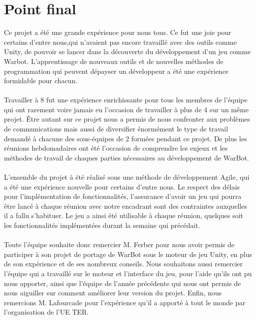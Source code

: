 \documentclass{report}
\begin{document}
\section{Point final}
Ce projet a été une grande expérience pour nous tous.\newline
Ce fut une joie pour certains d’entre nous,qui n’avaient pas encore travaillé avec des outils comme Unity,  de pouvoir se lancer dans la découverte du développement d’un jeu comme Warbot.\newline
L’apprentissage de nouveaux outils et de nouvelles méthodes de programmation qui peuvent dépayser un développeur a été une expérience formidable pour chacun.
\paragraph{}
Travailler à 8 fut une expérience enrichissante pour tous les membres de l’équipe qui ont rarement voire jamais eu l’occasion de travailler à plus de 4 sur un même projet. \newline
Être autant sur ce projet nous a permis de nous confronter aux problèmes de communications mais aussi de diversifier énormément le type de travail demandé à chacune des sous-équipes de 2 formées pendant ce projet. De plus les réunions hebdomadaires ont été l’occasion de comprendre les enjeux et les méthodes de travail de chaques parties nécessaires au développement de WarBot. 
\paragraph{}
L’ensemble du projet à été réalisé sous une méthode de développement Agile, qui a été une expérience nouvelle pour certains d’entre nous.\newline
Le respect des délais pour l’implémentation de fonctionnalités, l’assurance d’avoir un jeu qui pourra être lancé à chaque réunion avec notre encadrant sont des contraintes auxquelles il a fallu s’habituer. \newline
Le jeu a ainsi été utilisable à chaque réunion, quelques soit les fonctionnalités implémentées durant la semaine qui précédait. 
\paragraph{}
Toute l’équipe souhaite donc remercier M. Ferber pour nous avoir permis de participer à son projet de portage de WarBot sous le moteur de jeu Unity, en plus de son expérience et de ses nombreux conseils. \newline
Nous souhaitons aussi remercier l’équipe qui a travaillé sur le moteur et l’interface du jeu, pour l’aide qu’ils ont pu nous apporter, ainsi que l’équipe de l’année précédente qui nous ont permis de nous aiguiller sur comment améliorer leur version du projet. \newline
Enfin, nous remercions M. Lafourcade pour l’expérience qu’il a apporté à tout le monde par l’organisation de l’UE TER.
\end{document}
